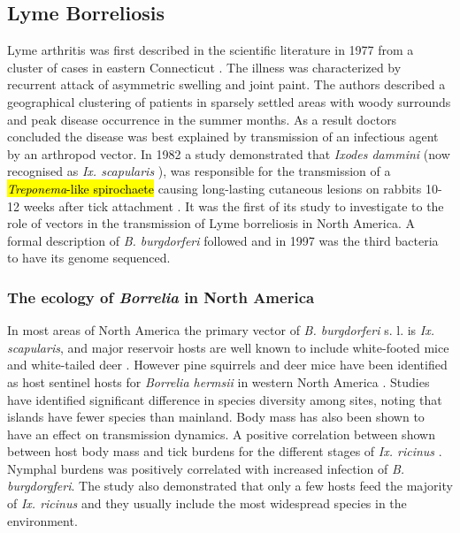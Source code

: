 \documentclass[a4paper, nobind]{templates/ociamthesis}
\begin{document}
\hypertarget{lyme-borreliosis}{%
\subsection{Lyme Borreliosis}\label{lyme-borreliosis}}

Lyme arthritis was first described in the scientific literature in 1977 from a cluster of cases in eastern Connecticut \autocite{steereLymeArthritisEpidemic1977}.
The illness was characterized by recurrent attack of asymmetric swelling and joint paint.
The authors described a geographical clustering of patients in sparsely settled areas with woody surrounds and peak disease occurrence in the summer months.
As a result doctors concluded the disease was best explained by transmission of an infectious agent by an arthropod vector.
In 1982 a study demonstrated that \emph{Ixodes dammini} (now recognised as \emph{Ix. scapularis} \autocite{sandersIxodesDamminiJunior1998}), was responsible for the transmission of a \hl{\emph{Treponema}-like spirochaete} causing long-lasting cutaneous lesions on rabbits 10-12 weeks after tick attachment \autocite{burgdorferLymeDiseaseTickborne1982}.
It was the first of its study to investigate to the role of vectors in the transmission of Lyme borreliosis in North America.
A formal description of \emph{B. burgdorferi} followed \autocite{johnsonBorreliaBurgdorferiSp1984} and in 1997 \autocite{fraserGenomicSequenceLyme1997} was the third bacteria to have its genome sequenced.

\hypertarget{the-ecology-of-borrelia-in-north-america}{%
\subsubsection{\texorpdfstring{The ecology of \emph{Borrelia} in North America}{The ecology of Borrelia in North America}}\label{the-ecology-of-borrelia-in-north-america}}

In most areas of North America the primary vector of \emph{B. burgdorferi} s. l. is \emph{Ix. scapularis}, and major reservoir hosts are well known to include white-footed mice and white-tailed deer \autocite{halseyRoleIxodesScapularis2018}.
However pine squirrels and deer mice have been identified as host sentinel hosts for \emph{Borrelia hermsii} in western North America \autocite{cadenasIdentificationHostBloodmeal2007}.
Studies have identified significant difference in species diversity among sites, noting that islands have fewer species than mainland.
Body mass has also been shown to have an effect on transmission dynamics.
A positive correlation between shown between host body mass and tick burdens for the different stages of \emph{Ix. ricinus} \autocite{hofmeesterFewVertebrateSpecies2016}.
Nymphal burdens was positively correlated with increased infection of \emph{B. burgdorgferi}.
The study also demonstrated that only a few hosts feed the majority of \emph{Ix. ricinus} and they usually include the most widespread species in the environment.
\end{document}
